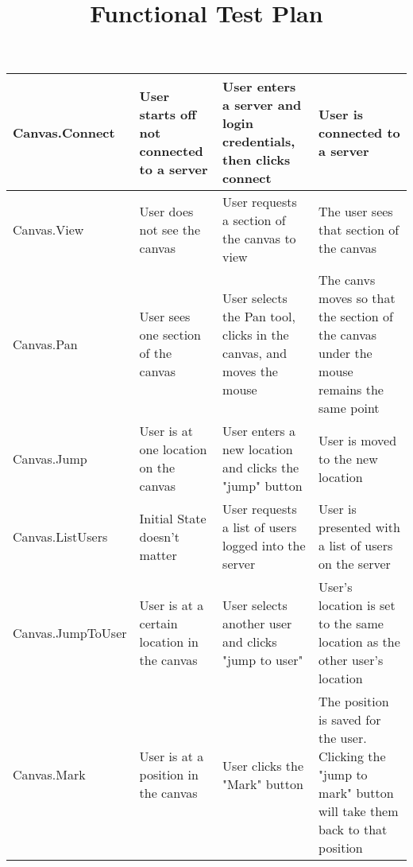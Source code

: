 \documentclass[11pt,oneside,a4paper]{article}
\title{Functional Test Plan}
\begin{document}
\maketitle
\begin{tabular}{ | p{3cm} | p{3cm} | p{3cm} | p{3cm} | }
\hline
\tiny{Canvas.Connect}	&	\tiny{User starts off not connected to a server}
& \tiny{User enters a server and login credentials, then clicks connect}	&
\tiny {User is connected to a server}	\\
\hline
\tiny{Canvas.View}	& \tiny{User does not see the canvas}	& \tiny{User requests a section of the canvas to view}	& \tiny{The user sees that section
of the canvas} \\
\hline
\tiny{Canvas.Pan} & \tiny{User sees one section of the canvas} & \tiny{User
selects the Pan tool, clicks in the canvas, and moves the mouse}	& \tiny{The
canvs moves so that the section of the canvas under the mouse remains the same
point} \\
\hline
\tiny{Canvas.Jump} & \tiny{User is at one location on the canvas}	&
\tiny{User enters a new location and clicks the "jump" button}	& \tiny{User is
moved to the new location} \\
\hline
\tiny{Canvas.ListUsers}	& \tiny{Initial State doesn't matter}	& \tiny{User
requests a list of users logged into the server}	& \tiny{User is presented
with a list of users on the server} \\
\hline
\tiny{Canvas.JumpToUser}	& \tiny{User is at a certain location in the
canvas}	& \tiny{User selects another user and clicks "jump to user"}	&
\tiny{User's location is set to the same location as the other user's location}
\\
\hline
\tiny{Canvas.Mark}	& \tiny{User is at a position in the canvas}	&
\tiny{User clicks the "Mark" button}	&	\tiny{The position is saved for the
user. Clicking the "jump to mark" button will take them back to that position}
\\
\hline
\end{tabular}
\end{document}
